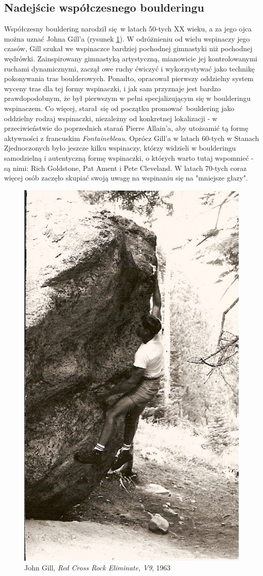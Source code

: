 \documentclass{article}
\begin{document}
\subsection{Nadejście współczesnego boulderingu}
Współczesny bouldering narodził się w latach 50-tych XX wieku, a za jego ojca można uznać Johna Gill'a (rysunek \ref{gill-1}). W odróżnieniu od wielu wspinaczy jego czasów, Gill szukał we wspinaczce bardziej pochodnej gimnastyki niż pochodnej wędrówki. Zainspirowany gimnastyką artystyczną, mianowicie jej kontrolowanymi ruchami dynamicznymi, zaczął owe ruchy ćwiczyć i wykorzystywać jako technikę pokonywania tras boulderowych. Ponadto, opracował pierwszy oddzielny system wyceny tras dla tej formy wspinaczki, i jak sam przyznaje jest bardzo prawdopodobnym, że był pierwszym w pełni specjalizującym się w boulderingu wspinaczem. Co więcej, starał się od początku promować bouldering jako oddzielny rodzaj wspinaczki, niezależny od konkretnej lokalizacji - w przeciwieństwie do poprzednich starań Pierre Allain'a, aby utożsamić tą formę aktywności z francuskim \textit{Fontainebleau}. Oprócz Gill'a w latach 60-tych w Stanach Zjednoczonych było jeszcze kilku wspinaczy, którzy widzieli w boulderingu samodzielną i autentyczną formę wspinaczki, o których warto tutaj wspomnieć - są nimi: Rich Goldstone, Pat Ament i Pete Cleveland. W latach 70-tych coraz więcej osób zaczęło skupiać swoją uwagę na wspinaniu się na "mniejsze głazy".

\begin{figure}[!htbp]
	\begin{center}
		\includegraphics[width=0.5\linewidth]{images/gill-1.eps}
	\end{center}
	\caption{John Gill, \textit{Red Cross Rock Eliminate, V9}, 1963 \cite{gill-wiki}}
	\label{gill-1}
\end{figure}
\end{document}
